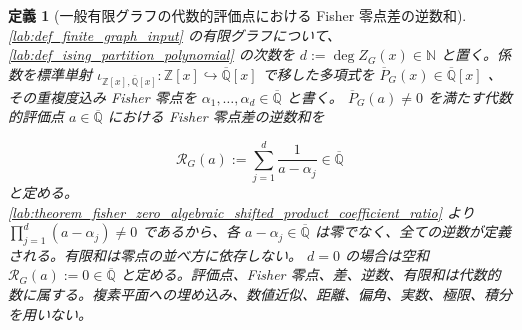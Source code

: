 \documentclass[11pt,a4paper]{article}
\newtheorem{definition}{定義}[section]
\theoremstyle{remark}
\begin{document}
\begin{definition}[一般有限グラフの代数的評価点における Fisher 零点差の逆数和]\label{lab:def_fisher_zero_algebraic_shifted_reciprocal_sum}
\cref{lab:def_finite_graph_input}
 の有限グラフについて、
\cref{lab:def_ising_partition_polynomial}
 の次数を
$d:=\deg Z_G(x)\in\mathbb N$
 と置く。係数を標準単射
$\iota_{\mathbb Z[x],\overline{\mathbb Q}[x]}:\mathbb Z[x]\hookrightarrow\overline{\mathbb Q}[x]$
 で移した多項式を
$\overline P_G(x)\in\overline{\mathbb Q}[x]$
、その重複度込み Fisher 零点を
$\alpha_1,\ldots,\alpha_d\in\overline{\mathbb Q}$
 と書く。
$\overline P_G(a)\ne0$
 を満たす代数的評価点
$a\in\overline{\mathbb Q}$
 における Fisher 零点差の逆数和を

\[\mathcal R_G(a)
:=
\sum_{j=1}^{d}\frac{1}{a-\alpha_j}
\in\overline{\mathbb Q}\]
と定める。
\cref{lab:theorem_fisher_zero_algebraic_shifted_product_coefficient_ratio}
 より
$\prod_{j=1}^{d}(a-\alpha_j)\ne0$
 であるから、各
$a-\alpha_j\in\overline{\mathbb Q}$
 は零でなく、全ての逆数が定義される。有限和は零点の並べ方に依存しない。
$d=0$
 の場合は空和
$\mathcal R_G(a):=0\in\overline{\mathbb Q}$
 と定める。評価点、Fisher 零点、差、逆数、有限和は代数的数に属する。複素平面への埋め込み、数値近似、距離、偏角、実数、極限、積分を用いない。

\end{definition}
\end{document}
